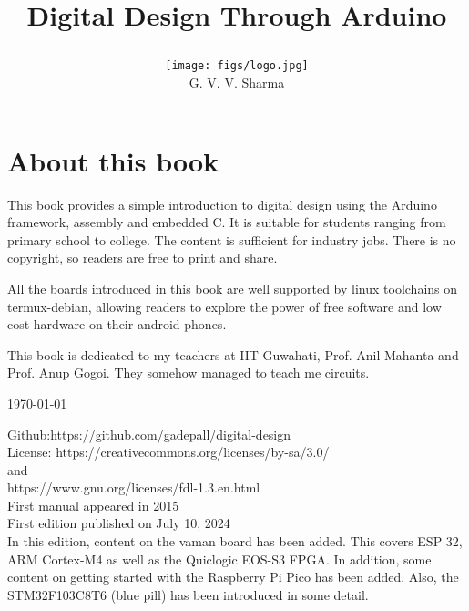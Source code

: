 \documentclass[journal]{IEEEtran}
\begin{document}

\onecolumn


\title{
	\begin{center}
Digital Design Through Arduino
\end{center}
}
\author{
\vspace{11cm}
	\begin{center}
\texttt{[image: figs/logo.jpg]}
\\
		{\huge	G. V. V. Sharma}
	\end{center}
}
\maketitle

\newpage

\section*{About this book}
This book provides a simple introduction to digital design using the Arduino framework, assembly and embedded C.  It is suitable for students ranging from primary school to college.  The content is sufficient for  industry jobs.
There is no copyright, so readers are free to print and share.

All the boards introduced in this book are well supported by linux toolchains on termux-debian, allowing readers to explore the power of free software and low cost hardware on their android phones.

This book is dedicated to my teachers at IIT Guwahati, Prof. Anil Mahanta and Prof. Anup Gogoi.  They somehow managed to teach me circuits. 
\begin{flushright}
	\today
\end{flushright}
Github:https://github.com/gadepall/digital-design
\\
License: https://creativecommons.org/licenses/by-sa/3.0/
\\
and
\\
https://www.gnu.org/licenses/fdl-1.3.en.html
\\
First manual appeared in 2015
\\
First edition published on July 10, 2024
\\
In this edition, content on the vaman board has been added.  This covers ESP 32, ARM Cortex-M4 as well as the Quiclogic EOS-S3 FPGA. In addition, some content on getting started with the Raspberry Pi Pico has been added.  Also, the STM32F103C8T6 (blue pill) has been introduced in some detail.
\newpage
\tableofcontents
\end{document}
